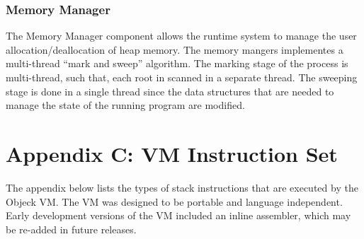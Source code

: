 \documentclass[12pt]{article}
\begin{document}
\subsubsection{Memory Manager}
The Memory Manager component allows the runtime system to manage the user allocation/deallocation of heap memory.  The memory mangers implementes a multi-thread ``mark and sweep'' algorithm.  The marking stage of the process is multi-thread, such that, each root in scanned in a separate thread.  The sweeping stage is done in a single thread since the data structures that are needed to manage the state of the running program are modified.

\section{Appendix C: VM Instruction Set}
The appendix below lists the types of stack instructions that are executed by the Objeck VM.  The VM was designed to be portable and language independent.  Early development versions of the VM included an inline assembler, which may be re-added in future releases.
\end{document}

